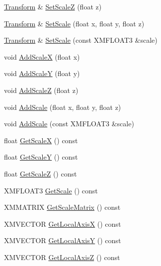 \begin{DoxyCompactItemize}
\item 
\hyperlink{structmage_1_1_transform}{Transform} \& \hyperlink{structmage_1_1_transform_aa81c14d27155d26a0ea75b68d6b34d46}{Set\+ScaleZ} (float z)
\item 
\hyperlink{structmage_1_1_transform}{Transform} \& \hyperlink{structmage_1_1_transform_a334ea52f7dc62ed66cbcb0687bbd530c}{Set\+Scale} (float x, float y, float z)
\item 
\hyperlink{structmage_1_1_transform}{Transform} \& \hyperlink{structmage_1_1_transform_a2506deecc671c71119e52ba9b3335d00}{Set\+Scale} (const X\+M\+F\+L\+O\+A\+T3 \&scale)
\item 
void \hyperlink{structmage_1_1_transform_afb49f4e4ca1772f8ed38465afcf414a0}{Add\+ScaleX} (float x)
\item 
void \hyperlink{structmage_1_1_transform_ae3213b5cc2b347236783389c1b717356}{Add\+ScaleY} (float y)
\item 
void \hyperlink{structmage_1_1_transform_aa493f3a588376d094ce50dfcffe0ece2}{Add\+ScaleZ} (float z)
\item 
void \hyperlink{structmage_1_1_transform_a10681b78ac7980fa3aa6c6c11a274f99}{Add\+Scale} (float x, float y, float z)
\item 
void \hyperlink{structmage_1_1_transform_a7f5092b95426c47a55bd3dff16cea31e}{Add\+Scale} (const X\+M\+F\+L\+O\+A\+T3 \&scale)
\item 
float \hyperlink{structmage_1_1_transform_a3a82465d40dde6b98ca274a8de061545}{Get\+ScaleX} () const
\item 
float \hyperlink{structmage_1_1_transform_acbd677fa7e27cb15d205ac8354d8624a}{Get\+ScaleY} () const
\item 
float \hyperlink{structmage_1_1_transform_a9e8f3a4ec330e6f4c9e1a9607daf30fa}{Get\+ScaleZ} () const
\item 
X\+M\+F\+L\+O\+A\+T3 \hyperlink{structmage_1_1_transform_a38234d822ee1ffbbcfb2601a1d5f8475}{Get\+Scale} () const
\item 
X\+M\+M\+A\+T\+R\+IX \hyperlink{structmage_1_1_transform_ab78050be41abf1ab36d969d5235f97e2}{Get\+Scale\+Matrix} () const
\item 
X\+M\+V\+E\+C\+T\+OR \hyperlink{structmage_1_1_transform_af1db1f130cf15d7ec6c9a7a9f454dfe4}{Get\+Local\+AxisX} () const
\item 
X\+M\+V\+E\+C\+T\+OR \hyperlink{structmage_1_1_transform_a101b2b97c9c94ce534e45e5bebafbebe}{Get\+Local\+AxisY} () const
\item 
X\+M\+V\+E\+C\+T\+OR \hyperlink{structmage_1_1_transform_a426ae69a8a597413bd2772826cc2f21e}{Get\+Local\+AxisZ} () const

\end{DoxyCompactItemize}
